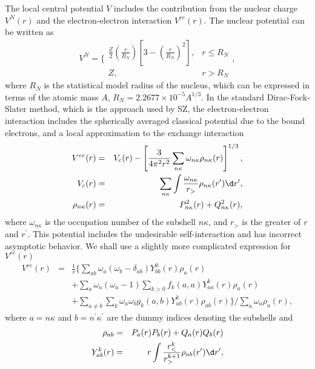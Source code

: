 \documentclass{elsart}
\begin{document}
The local central potential $V$ includes the contribution from the nuclear
charge $V^N(r)$ and the electron-electron interaction $V^{ee}(r)$. The nuclear
potential can be written as
\begin{equation}
\label{eq_nuclear}
V^{N} = \Bigg\{\begin{array}{ll}
\frac{Z}{2}\left(\frac{r}{R_N}\right)
\left[3-\left(\frac{r}{R_N}\right)^2\right], & r \le R_N \nonumber\\
Z, & r > R_N
\end{array},
\end{equation}
where $R_N$ is the statistical model radius of the nucleus, which can be
expressed in terms of the atomic mass $A$, $R_N = 2.2677\times 10^{-5}
A^{1/3}$. In the standard Dirac-Fock-Slater method, which is the approach used
by SZ, the electron-electron interaction includes the spherically averaged
classical potential due to the bound electrons, and a local approximation to
the exchange interaction
\begin{eqnarray}
\label{eq_ee}
V^{ee}(r) &=& V_c(r) - \left[\frac{3}{4\pi^2 r^2}\sum_{n\kappa}
\omega_{n\kappa}\rho_{n\kappa}(r)\right]^{1/3}, \nonumber\\
V_c(r) &=& \sum_{n\kappa}\int \frac{\omega_{n\kappa}}{r_>}
\rho_{n\kappa}(r^\prime)\d r^{\prime}, \nonumber\\
\rho_{n\kappa}(r) &=& P_{n\kappa}^2(r) + Q_{n\kappa}^2(r), 
\end{eqnarray}
where $\omega_{n\kappa}$ is the occupation number of the subshell
$n\kappa$, and $r_>$ is the greater of $r$ and $r^{\prime}$. This potential
includes the undesirable self-interaction and has incorrect asymptotic
behavior. We shall use a slightly more complicated expression for $V^{ee}(r)$
\begin{eqnarray}
\label{eq_nee}
V^{ee}(r) &=& \frac{1}{r}\Big\{\sum_{ab}\omega_a(\omega_b - 
\delta_{ab})Y^0_{bb}(r)\rho_a(r) \nonumber\\
&&+\sum_a\omega_a(\omega_a-1)\sum_{k>0}f_{k}(a,a)Y^{k}_{aa}(r)\rho_a(r) 
\nonumber\\
&&+\sum_{a\ne b} \sum_k \omega_a\omega_b 
g_{k}(a,b) Y^{k}_{ab}(r)\rho_{ab}(r)\Big\} \Big/ \sum_a \omega_a\rho_a(r),
\end{eqnarray}
where $a = n\kappa$ and $b = n^\prime\kappa^\prime$ are the dummy indices
denoting the subshells and 
\begin{eqnarray}
\label{eq_yk} 
\rho_{ab} &=& P_a(r)P_b(r) + Q_a(r)Q_b(r) \nonumber\\
Y^k_{ab}(r) &=& r\int\frac{r_<^k}{r_>^{k+1}}\rho_{ab}(r^\prime)\d r^\prime,
\end{eqnarray}
\end{document}
